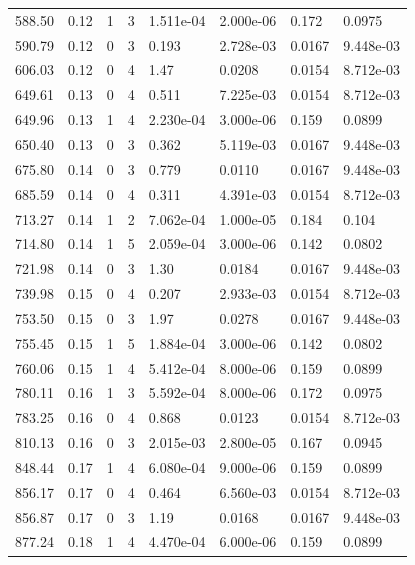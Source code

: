 \documentclass[preview]{standalone}
\begin{document}
{{{\begin{tabular}{L{1.2cm}C{1.2cm} C{0.3cm}C{0.5cm} C{1.4cm}C{1.4cm} C{1.4cm}C{1.4cm}}
  588.50  &  0.12  & 1     &  3 &  1.511e-04  & 2.000e-06  & 0.172 &  0.0975   \\ 
  590.79  &  0.12  & 0     &  3 &  0.193  & 2.728e-03  & 0.0167 &  9.448e-03   \\ 
  606.03  &  0.12  & 0     &  4 &  1.47  & 0.0208  & 0.0154 &  8.712e-03   \\ 
  649.61  &  0.13  & 0     &  4 &  0.511  & 7.225e-03  & 0.0154 &  8.712e-03   \\ 
  649.96  &  0.13  & 1     &  4 &  2.230e-04  & 3.000e-06  & 0.159 &  0.0899   \\ 
  650.40  &  0.13  & 0     &  3 &  0.362  & 5.119e-03  & 0.0167 &  9.448e-03   \\ 
  675.80  &  0.14  & 0     &  3 &  0.779  & 0.0110  & 0.0167 &  9.448e-03   \\ 
  685.59  &  0.14  & 0     &  4 &  0.311  & 4.391e-03  & 0.0154 &  8.712e-03   \\ 
  713.27  &  0.14  & 1     &  2 &  7.062e-04  & 1.000e-05  & 0.184 &  0.104   \\ 
  714.80  &  0.14  & 1     &  5 &  2.059e-04  & 3.000e-06  & 0.142 &  0.0802   \\ 
  721.98  &  0.14  & 0     &  3 &  1.30  & 0.0184  & 0.0167 &  9.448e-03   \\ 
  739.98  &  0.15  & 0     &  4 &  0.207  & 2.933e-03  & 0.0154 &  8.712e-03   \\ 
  753.50  &  0.15  & 0     &  3 &  1.97  & 0.0278  & 0.0167 &  9.448e-03   \\ 
  755.45  &  0.15  & 1     &  5 &  1.884e-04  & 3.000e-06  & 0.142 &  0.0802   \\ 
  760.06  &  0.15  & 1     &  4 &  5.412e-04  & 8.000e-06  & 0.159 &  0.0899   \\ 
  780.11  &  0.16  & 1     &  3 &  5.592e-04  & 8.000e-06  & 0.172 &  0.0975   \\ 
  783.25  &  0.16  & 0     &  4 &  0.868  & 0.0123  & 0.0154 &  8.712e-03   \\ 
  810.13  &  0.16  & 0     &  3 &  2.015e-03  & 2.800e-05  & 0.167 &  0.0945   \\ 
  848.44  &  0.17  & 1     &  4 &  6.080e-04  & 9.000e-06  & 0.159 &  0.0899   \\ 
  856.17  &  0.17  & 0     &  4 &  0.464  & 6.560e-03  & 0.0154 &  8.712e-03   \\ 
  856.87  &  0.17  & 0     &  3 &  1.19  & 0.0168  & 0.0167 &  9.448e-03   \\ 
  877.24  &  0.18  & 1     &  4 &  4.470e-04  & 6.000e-06  & 0.159 &  0.0899   \\ 

\end{tabular}}}}
\end{document}
